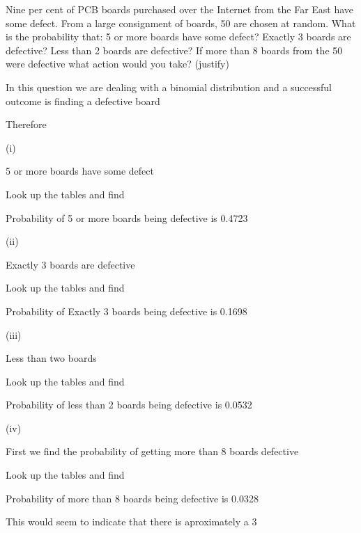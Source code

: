 Nine per cent of PCB boards purchased over the Internet from the Far East have some defect.  From a large consignment of boards, 50 are chosen at random.  What is the probability that:
5 or more boards have some defect?
Exactly 3 boards are defective?
Less than 2 boards are defective?
If more than 8 boards from the 50 were defective what action would you take? (justify)

In this question we are dealing with a binomial distribution and a successful outcome is finding a defective board

Therefore                 


(i)

5 or more boards have some defect

Look up the tables and find 


Probability of 5 or more boards being defective is 0.4723

(ii)

Exactly 3 boards are defective

Look up the tables and find 



Probability of Exactly 3  boards being defective is 0.1698

(iii)

Less than two boards

Look up the tables and find 



Probability of less than 2 boards being defective is 0.0532

(iv)

First we find the probability of getting more than 8 boards defective

Look up the tables and find 



Probability of more than 8 boards being defective is 0.0328

This would seem to indicate that there is aproximately a 3%
